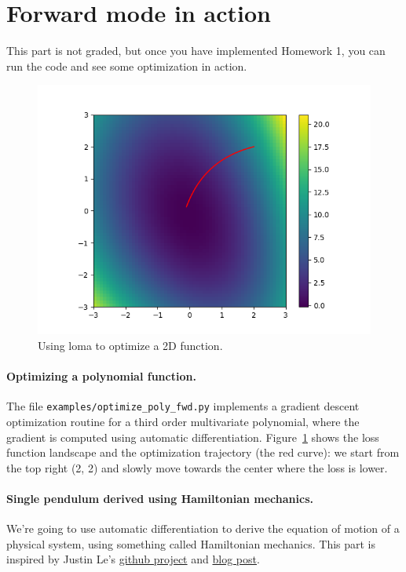 \section{Forward mode in action}
This part is not graded, but once you have implemented Homework 1, you can run the code and see some optimization in action. 

\begin{figure}
\centering
\includegraphics[width=0.8\linewidth]{imgs/optimize-fwd.png}
\caption{Using loma to optimize a 2D function.}
\label{fig:optimize}
\end{figure}

\paragraph{Optimizing a polynomial function.} The file \lstinline{examples/optimize_poly_fwd.py} implements a gradient descent optimization routine for a third order multivariate polynomial, where the gradient is computed using automatic differentiation. Figure~\ref{fig:optimize} shows the loss function landscape and the optimization trajectory (the red curve): we start from the top right (2, 2) and slowly move towards the center where the loss is lower.

\paragraph{Single pendulum derived using Hamiltonian mechanics.} 
We're going to use automatic differentiation to derive the equation of motion of a physical system, using something called Hamiltonian mechanics. This part is inspired by Justin Le's \href{https://github.com/mstksg/hamilton}{github project} and \href{https://blog.jle.im/entry/hamiltonian-dynamics-in-haskell.html}{blog post}.

